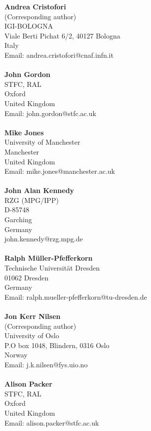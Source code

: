 \textbf{Andrea Cristofori} \\
(Corresponding author) \\
IGI-BOLOGNA \\
Viale Berti Pichat 6/2, 40127 Bologna \\
Italy \\
Email: andrea.cristofori@cnaf.infn.it \\
\\
\textbf{John Gordon} \\
STFC, RAL \\
Oxford \\
United Kingdom \\
Email: john.gordon@stfc.ac.uk \\
\\
\textbf{Mike Jones} \\
University of Manchester \\
Manchester \\
United Kingdom \\
Email: mike.jones@manchester.ac.uk \\
\\
\textbf{John Alan Kennedy} \\
RZG (MPG/IPP) \\
D-85748 \\
Garching \\
Germany \\
john.kennedy@rzg.mpg.de \\
\\
\textbf{Ralph M\"uller-Pfefferkorn} \\
Technische Universität Dresden \\
01062 Dresden \\
Germany \\
Email: ralph.mueller-pfefferkorn@tu-dresden.de \\
\\
\textbf{Jon Kerr Nilsen} \\
(Corresponding author) \\
University of Oslo \\
P.O box 1048, Blindern, 0316 Oslo \\
Norway \\
Email: j.k.nilsen@fys.uio.no \\
\\
\textbf{Alison Packer} \\
STFC, RAL \\
Oxford \\
United Kingdom \\
Email: alison.packer@stfc.ac.uk \\
\\
